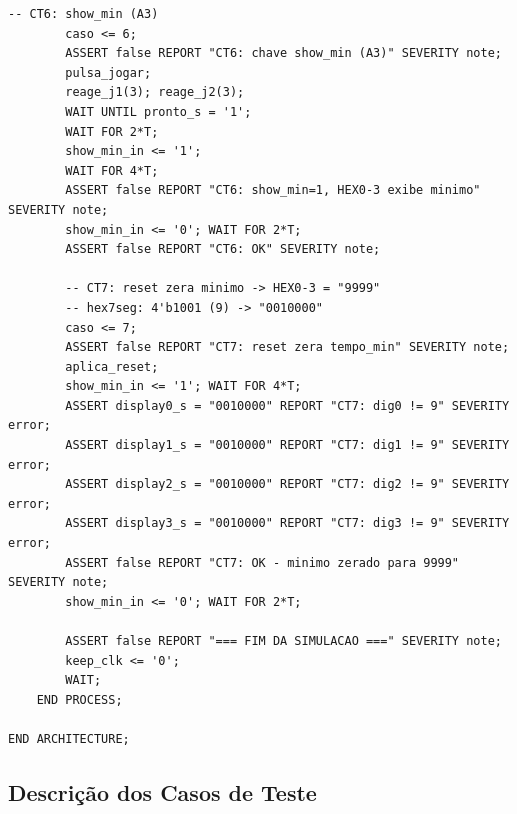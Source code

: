 \documentclass[12pt,a4paper]{article}
\begin{document}
\begin{lstlisting}[caption={Bancada de testes -- \texttt{jogo\_tempo\_reacao\_tb.vhd}},
                   label={lst:tb}]
        -- CT6: show_min (A3)
        caso <= 6;
        ASSERT false REPORT "CT6: chave show_min (A3)" SEVERITY note;
        pulsa_jogar;
        reage_j1(3); reage_j2(3);
        WAIT UNTIL pronto_s = '1';
        WAIT FOR 2*T;
        show_min_in <= '1';
        WAIT FOR 4*T;
        ASSERT false REPORT "CT6: show_min=1, HEX0-3 exibe minimo" SEVERITY note;
        show_min_in <= '0'; WAIT FOR 2*T;
        ASSERT false REPORT "CT6: OK" SEVERITY note;

        -- CT7: reset zera minimo -> HEX0-3 = "9999"
        -- hex7seg: 4'b1001 (9) -> "0010000"
        caso <= 7;
        ASSERT false REPORT "CT7: reset zera tempo_min" SEVERITY note;
        aplica_reset;
        show_min_in <= '1'; WAIT FOR 4*T;
        ASSERT display0_s = "0010000" REPORT "CT7: dig0 != 9" SEVERITY error;
        ASSERT display1_s = "0010000" REPORT "CT7: dig1 != 9" SEVERITY error;
        ASSERT display2_s = "0010000" REPORT "CT7: dig2 != 9" SEVERITY error;
        ASSERT display3_s = "0010000" REPORT "CT7: dig3 != 9" SEVERITY error;
        ASSERT false REPORT "CT7: OK - minimo zerado para 9999" SEVERITY note;
        show_min_in <= '0'; WAIT FOR 2*T;

        ASSERT false REPORT "=== FIM DA SIMULACAO ===" SEVERITY note;
        keep_clk <= '0';
        WAIT;
    END PROCESS;

END ARCHITECTURE;
\end{lstlisting}

\subsection{Descrição dos Casos de Teste}
\end{document}
